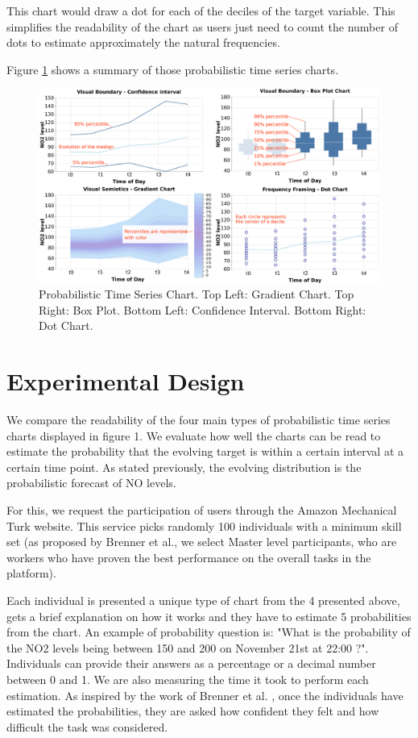 \documentclass[a4paper,3p,sort&compress]{elsarticle}
\begin{document}
This chart would draw a dot for each of the deciles of the target variable. This simplifies the 
readability of the chart as users just need to count the number of dots to estimate approximately 
the natural frequencies.

Figure \ref{figure:charts} shows a summary of those probabilistic time series charts.

\begin{figure}
  \centering
  \includegraphics[width=.8\textwidth]{charts_vector} 
  \caption{\label{figure:charts} Probabilistic Time Series Chart. 
  Top Left: Gradient Chart. Top Right: Box Plot. 
  Bottom Left: Confidence Interval. Bottom Right: Dot Chart.  }
\end{figure}

\section{Experimental Design}
\label{sec:exp_design}

We compare the readability of the four main types of probabilistic time series charts 
displayed in figure 1. We evaluate how well the charts can be read to estimate the probability 
that the evolving target is within a certain interval at a certain time point. As stated previously, 
the evolving distribution is the probabilistic forecast of NO levels. 

For this, we request the participation of users through the Amazon Mechanical Turk website. 
This service picks randomly 100 individuals with a minimum skill set (as proposed by Brenner 
et al., we select Master level participants, who are workers who have proven the best performance 
on the overall tasks in the platform).

Each individual is presented a unique type of chart from the 4 presented above, gets a brief 
explanation on how it works and they have to estimate 5 probabilities from the chart. An example of
probability question is: "What is the probability of the NO2 levels being between 150 and 200 on 
November 21st at 22:00 ?". Individuals can provide their answers as a percentage or a 
decimal number between 0
and 1. We are also measuring the time it took to perform each estimation. 
As inspired by the work of Brenner et 
al. , once the individuals have estimated the probabilities, they are asked how confident they 
felt and how difficult the task was considered.
\end{document}
